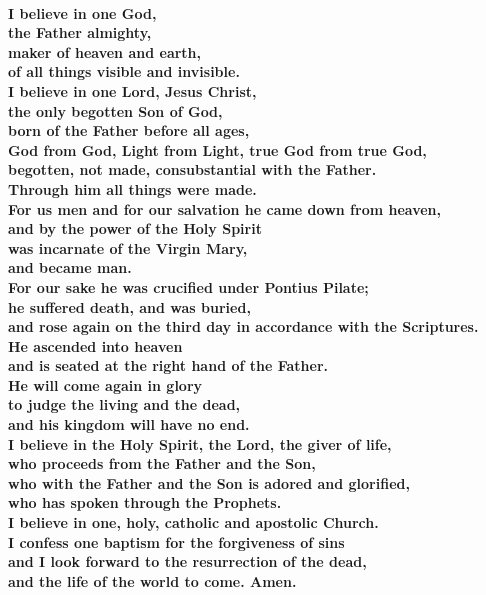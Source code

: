 \\


\vspace{10mm}


\textbf{I believe in one God,\\
the Father almighty,\\
maker of heaven and earth,\\
of all things visible and invisible.\\
I believe in one Lord, Jesus Christ,\\
the only begotten Son of God,\\
born of the Father before all ages,\\
God from God, Light from Light, true God from true God,\\
begotten, not made, consubstantial with the Father.\\
Through him all things were made.\\
For us men and for our salvation he came down from heaven,\\
and by the power of the Holy Spirit\\
was incarnate of the Virgin Mary,\\
and became man.\\
For our sake he was crucified under Pontius Pilate;\\
he suffered death, and was buried,\\
and rose again on the third day in accordance with the Scriptures.\\
He ascended into heaven\\
and is seated at the right hand of the Father.\\
He will come again in glory\\
to judge the living and the dead,\\
and his kingdom will have no end.\\
I believe in the Holy Spirit, the Lord, the giver of life,\\
who proceeds from the Father and the Son,\\
who with the Father and the Son is adored and glorified,\\
who has spoken through the Prophets.\\
I believe in one, holy, catholic and apostolic Church.\\
I confess one baptism for the forgiveness of sins\\
and I look forward to the resurrection of the dead,\\
and the life of the world to come. Amen.}

